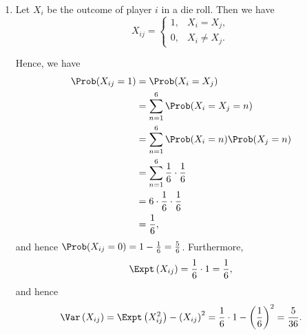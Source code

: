 \Question{\currfilebase}
\begin{enumerate}
    \item Let \(X_i\) be the outcome of player \(i\) in a die roll. Then we have
          \[
              X_{ij} = \begin{cases}
                  1, & X_i = X_j,    \\
                  0, & X_i \neq X_j.
              \end{cases}
          \]

          Hence, we have
          \begin{align*}
              \Prob(X_{ij} = 1) & = \Prob(X_i = X_j)                               \\
                                & = \sum_{n = 1}^{6} \Prob(X_i = X_j = n)          \\
                                & = \sum_{n = 1}^{6} \Prob(X_i = n) \Prob(X_j = n) \\
                                & = \sum_{n = 1}^{6} \frac{1}{6} \cdot \frac{1}{6} \\
                                & = 6 \cdot \frac{1}{6} \cdot \frac{1}{6}          \\
                                & = \frac{1}{6},
          \end{align*}
          and hence \(\Prob(X_{ij} = 0) = 1 - \frac{1}{6} = \frac{5}{6}\). Furthermore,
          \[
              \Expt\left(X_{ij}\right) = \frac{1}{6} \cdot 1 = \frac{1}{6},
          \]
          and hence
          \[
              \Var\left(X_{ij}\right) = \Expt\left(X_{ij}^2\right) - \left(X_{ij}\right)^2 = \frac{1}{6} \cdot 1 - \left(\frac{1}{6}\right)^2 = \frac{5}{36}.
          \]


\end{enumerate}
